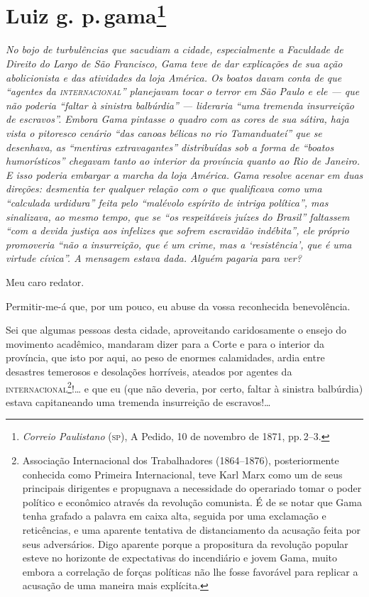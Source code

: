 \chapter{Luiz g. p.\,gama\footnote{\emph{Correio Paulistano} (\textsc{sp}), A Pedido, 10 de novembro de 1871,
  pp.\,2--3.}} %

\begin{didascalia}
\emph{No bojo de turbulências que sacudiam a cidade, especialmente a
Faculdade de Direito do Largo de São Francisco, Gama teve de dar
explicações de sua ação abolicionista e das atividades da loja América.
Os boatos davam conta de que ``agentes da \textsc{internacional}'' planejavam tocar
o terror em São Paulo e ele --- que não poderia ``faltar à sinistra
balbúrdia'' --- lideraria ``uma tremenda insurreição de escravos''. Embora
Gama pintasse o quadro com as cores de sua sátira, haja vista o
pitoresco cenário ``das canoas bélicas no rio Tamanduateí'' que se
desenhava, as ``mentiras extravagantes'' distribuídas sob a forma de
``boatos humorísticos'' chegavam tanto ao interior da província quanto ao
Rio de Janeiro. E isso poderia embargar a marcha da loja América. Gama
resolve acenar em duas direções: desmentia ter qualquer relação com o
que qualificava como uma ``calculada urdidura'' feita pelo ``malévolo
espírito de intriga política'', mas sinalizava, ao mesmo tempo, que se
``os respeitáveis juízes do Brasil'' faltassem ``com a devida justiça aos
infelizes que sofrem escravidão indébita'', ele próprio promoveria ``não a
insurreição, que é um crime, mas a `resistência', que é uma virtude
cívica''. A mensagem estava dada. Alguém pagaria para ver?}
\end{didascalia}


Meu caro redator.

Permitir-me-á que, por um pouco, eu abuse da vossa reconhecida
benevolência.

Sei que algumas pessoas desta cidade, aproveitando caridosamente o
ensejo do movimento acadêmico, mandaram dizer para a Corte e para o
interior da província, que isto por aqui, ao peso de enormes
calamidades, ardia entre desastres temerosos e desolações horríveis,
ateados por agentes da \textsc{internacional}\footnote{ Associação Internacional
  dos Trabalhadores (1864--1876), posteriormente conhecida como Primeira
  Internacional, teve Karl Marx como um de seus principais dirigentes e
  propugnava a necessidade do operariado tomar o poder político e
  econômico através da revolução comunista. É de se notar que Gama tenha
  grafado a palavra em caixa alta, seguida por uma exclamação e
  reticências, e uma aparente tentativa de distanciamento da acusação
  feita por seus adversários. Digo aparente porque a propositura da
  revolução popular esteve no horizonte de expectativas do incendiário e
  jovem Gama, muito embora a correlação de forças políticas não lhe
  fosse favorável para replicar a acusação de uma maneira mais
  explícita.}!\ldots{} e que eu (que não deveria, por certo, faltar à
sinistra balbúrdia) estava capitaneando uma tremenda insurreição de
escravos!\ldots{}


